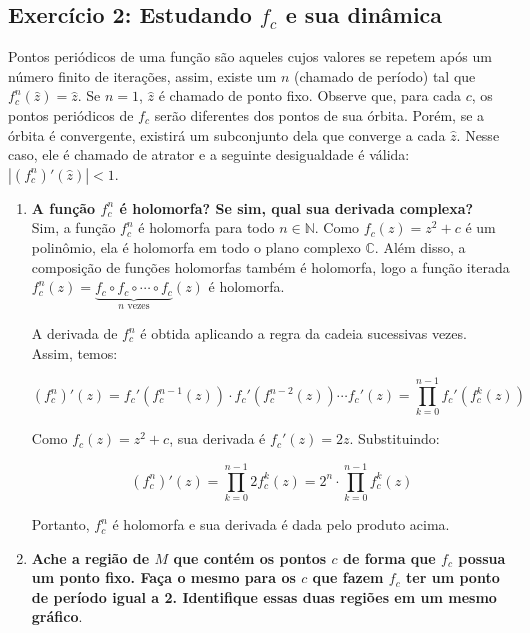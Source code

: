 \subsection{Exercício 2: Estudando \( f_c \) e sua dinâmica}

Pontos periódicos de uma função são aqueles cujos valores se repetem após um número finito de iterações, assim, existe um \( n \) (chamado de período) tal que \( f_c^n (\hat{z}) = \hat{z} \). Se \( n = 1 \), \( \hat{z} \) é chamado de ponto fixo. Observe que, para cada \( c \), os pontos periódicos de \( f_c \) serão diferentes dos pontos de sua órbita. Porém, se a órbita é convergente, existirá um subconjunto dela que converge a cada \( \hat{z} \). Nesse caso, ele é chamado de atrator e a seguinte desigualdade é válida: \( |(f_c^n)' (\hat{z})| < 1 \).

\begin{enumerate}[label=(\alph*)]
    \item \textbf{A função \( f_c^n \) é holomorfa? Se sim, qual sua derivada complexa?} \\
    
         Sim, a função \( f_c^n \) é holomorfa para todo \( n \in \mathbb{N} \). Como \( f_c(z) = z^2 + c \) é um polinômio, ela é holomorfa em todo o plano complexo \( \mathbb{C} \). Além disso, a composição de funções holomorfas também é holomorfa, logo a função iterada \( f_c^n(z) = \underbrace{f_c \circ f_c \circ \cdots \circ f_c}_{n \text{ vezes}}(z) \) é holomorfa.

        A derivada de \( f_c^n \) é obtida aplicando a regra da cadeia sucessivas vezes. Assim, temos:

        \[
        (f_c^n)'(z) = f_c'(f_c^{n-1}(z)) \cdot f_c'(f_c^{n-2}(z)) \cdots f_c'(z) = \prod_{k=0}^{n-1} f_c'(f_c^k(z))
        \]

        Como \( f_c(z) = z^2 + c \), sua derivada é \( f_c'(z) = 2z \). Substituindo:

        \[
        (f_c^n)'(z) = \prod_{k=0}^{n-1} 2 f_c^k(z) = 2^n \cdot \prod_{k=0}^{n-1} f_c^k(z)
        \]

        Portanto, \( f_c^n \) é holomorfa e sua derivada é dada pelo produto acima.


    \item \textbf{Ache a região de \( M \) que contém os pontos \( c \) de forma que \( f_c \) possua um ponto fixo. Faça o mesmo para os \( c \) que fazem \( f_c \) ter um ponto de período igual a 2. Identifique essas duas regiões em um mesmo gráfico}. \\
    

\end{enumerate}

